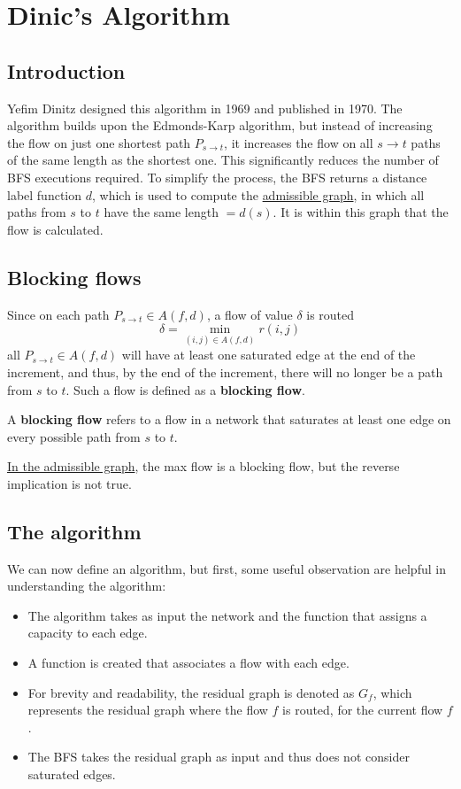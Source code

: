 
\chapter{Dinic's Algorithm} \label{chap:dnc}
\section{Introduction}
Yefim Dinitz designed this algorithm in 1969 and published\cite{Dinitz2006} in 1970. 
The algorithm builds upon the Edmonds-Karp algorithm, but instead of increasing the flow on just one shortest path $P_{s\rightarrow t}$, it increases the flow on all $s\rightarrow t$ paths of the same length as the shortest one.
This significantly reduces the number of BFS executions required.
To simplify the process, the BFS returns a distance label function $d$, which is used to compute the \hyperref[AdmissibleGraph]{admissible graph}, in which all paths from $s$ to $t$ have the same length $=d(s)$. It is within this graph that the flow is calculated.
\section{Blocking flows}
Since on each path $P_{s\rightarrow t} \in A(f,d)$, a flow of value $\delta$ is routed
\[\delta = \min_{(i,j)\in A(f,d)} r(i,j)\]
all $P_{s\rightarrow t} \in A(f,d)$ will have at least one saturated edge at the end of the increment, and thus, by the end of the increment, there will no longer be a path from $s$ to $t$.
Such a flow is defined as a \textbf{blocking flow}.
\begin{definition}
    A \textbf{blocking flow} refers to a flow in a network that saturates at least one edge on every possible path from $s$ to $t$.  
\end{definition}

\begin{obs}
    \underline{In the admissible graph}, the max flow is a blocking flow, but the reverse implication is not true.
\end{obs}
\newpage
\section{The algorithm}
We can now define an algorithm, but first, some useful observation are helpful in understanding the algorithm:

\begin{itemize}
    \item The algorithm takes as input the network and the function that assigns a capacity to each edge.
    \item A function is created that associates a flow with each edge.
    \item For brevity and readability, the residual graph is denoted as \( G_f \), which represents the residual graph where the flow \( f \) is routed, for the current flow $f$.
    \item The BFS takes the residual graph as input and thus does not consider saturated edges.
\end{itemize}


